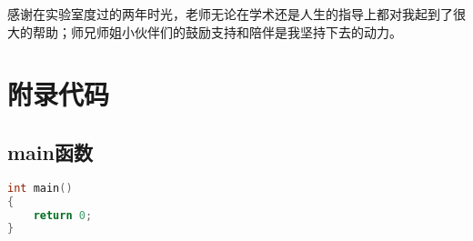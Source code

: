 \documentclass[winfonts,master,twoside,AutoFakeBold= {2}]{njuthesis}
\begin{document}












\begin{acknowledgement}
	感谢在实验室度过的两年时光，老师无论在学术还是人生的指导上都对我起到了很大的帮助；师兄师姐小伙伴们的鼓励支持和陪伴是我坚持下去的动力。
\end{acknowledgement}







\appendix
\chapter{附录代码}\label{app:1}
\section{main函数}
\begin{lstlisting}[language=C]
int main()
{
	return 0;
}
\end{lstlisting}
\end{document}
